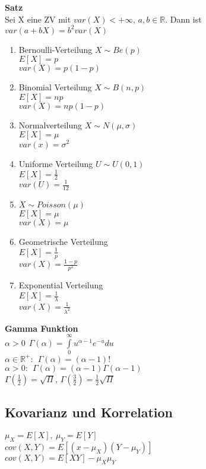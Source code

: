 \documentclass[10pt, a4paper, twocolumn]{scrartcl}
\begin{document}
\textbf{Satz}\\
Sei X eine ZV mit $var(X)<+\infty$, $a,b\in \mathbb{R}$. Dann ist $var(a+bX)=b^2 var(X)$\\

\begin{enumerate}
 \item Bernoulli-Verteilung $X\sim Be(p)$\\
  $E[X]=p$\\
  $var(X)=p(1-p)$
 \item Binomial Verteilung $X\sim B(n,p)$\\
  $E[X]=np$\\
  $var(X)=np(1-p)$
 \item Normalverteilung $X\sim N(\mu,\sigma)$\\
  $E[X]=\mu$\\
  $var(x)=\sigma^2$
 \item Uniforme Verteilung $U\sim U(0,1)$\\
  $E[X]=\frac{1}{2}$\\
  $var(U)=\frac{1}{12}$
 \item $X\sim Poisson(\mu)$\\
  $E[X]=\mu$\\
  $var(X)=\mu$
 \item Geometrische Verteilung\\
  $E[X]=\frac{1}{p}$\\
  $var(X)=\frac{1-p}{p^2}$
 \item Exponential Verteilung\\
  $E[X]=\frac{1}{\lambda}$\\
  $var(X)=\frac{1}{\lambda^2}$
\end{enumerate}

\textbf{Gamma Funktion}\\
$\alpha > 0\:\:\Gamma(\alpha)=\int\limits^{\infty}_{0}u^{\alpha-1}e^{-u}du$\\
$\alpha\in\mathbb{R}^{+}:\:\:\Gamma(\alpha)=(\alpha-1)!$\\
$\alpha > 0: \:\: \Gamma(\alpha)=(\alpha-1)\Gamma(\alpha-1)$\\
$\Gamma(\frac{1}{2})=\sqrt{\Pi}$, $\Gamma(\frac{3}{2})=\frac{1}{2}\sqrt{\Pi}$  


\subsection{Kovarianz und Korrelation}

$\mu_X = E[X],\:\mu_Y=E[Y]$\\
$cov(X,Y)=E[(x-\mu_X)(Y-\mu_Y)]$\\
$cov(X,Y)=E[XY]-\mu_X\mu_Y$\\
\end{document}
